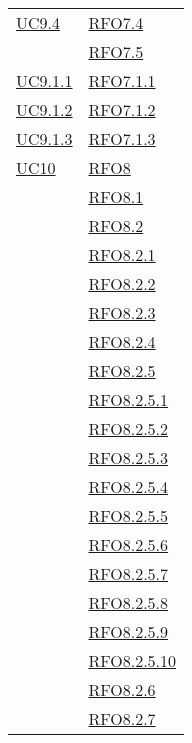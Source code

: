 \begin{longtable}{|>{\centering}m{5cm}|m{5cm}<{\centering}|}
\hyperlink{UC9.4}{UC9.4} & \hyperlink{RFO7.4}{RFO7.4}\\
& \hyperlink{RFO7.5}{RFO7.5}\\\hline
\hyperlink{UC9.1.1}{UC9.1.1} & \hyperlink{RFO7.1.1}{RFO7.1.1}\\\hline
\hyperlink{UC9.1.2}{UC9.1.2} & \hyperlink{RFO7.1.2}{RFO7.1.2}\\\hline
\hyperlink{UC9.1.3}{UC9.1.3} & \hyperlink{RFO7.1.3}{RFO7.1.3}\\\hline
\hyperlink{UC10}{UC10} & \hyperlink{RFO8}{RFO8}\\
& \hyperlink{RFO8.1}{RFO8.1}\\
& \hyperlink{RFO8.2}{RFO8.2}\\
& \hyperlink{RFO8.2.1}{RFO8.2.1}\\
& \hyperlink{RFO8.2.2}{RFO8.2.2}\\
& \hyperlink{RFO8.2.3}{RFO8.2.3}\\
& \hyperlink{RFO8.2.4}{RFO8.2.4}\\
& \hyperlink{RFO8.2.5}{RFO8.2.5}\\
& \hyperlink{RFO8.2.5.1}{RFO8.2.5.1}\\
& \hyperlink{RFO8.2.5.2}{RFO8.2.5.2}\\
& \hyperlink{RFO8.2.5.3}{RFO8.2.5.3}\\
& \hyperlink{RFO8.2.5.4}{RFO8.2.5.4}\\
& \hyperlink{RFO8.2.5.5}{RFO8.2.5.5}\\
& \hyperlink{RFO8.2.5.6}{RFO8.2.5.6}\\
& \hyperlink{RFO8.2.5.7}{RFO8.2.5.7}\\
& \hyperlink{RFO8.2.5.8}{RFO8.2.5.8}\\
& \hyperlink{RFO8.2.5.9}{RFO8.2.5.9}\\
& \hyperlink{RFO8.2.5.10}{RFO8.2.5.10}\\
& \hyperlink{RFO8.2.6}{RFO8.2.6}\\
& \hyperlink{RFO8.2.7}{RFO8.2.7}\\
\end{longtable}